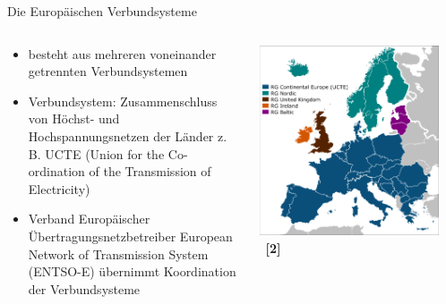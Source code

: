 \documentclass[aspectratio=1610, professionalfonts, 9pt]{beamer}
\begin{document}
{
\begin{frame}{Die Europäischen Verbundsysteme}
\begin{columns}
\begin{column}{0.5\textwidth}
\begin{itemize}
\item besteht aus mehreren voneinander getrennten Verbundsystemen
\item Verbundsystem:
Zusammenschluss von Höchst- und Hochspannungsnetzen der Länder  z. B. UCTE  (Union for the Co-ordination of the Transmission of Electricity)
\item Verband Europäischer Übertragungsnetzbetreiber
European Network of Transmission System (ENTSO-E) übernimmt Koordination
der Verbundsysteme
\end{itemize}
\end{column}
\begin{column}{0.5\textwidth}
\centering
\includegraphics[width=0.9\textwidth]{images/Euronetz.png} \ \textbf{\textcolor{tugreen}{[2]}}
\end{column}
\end{columns}
\end{frame}
}
\end{document}
